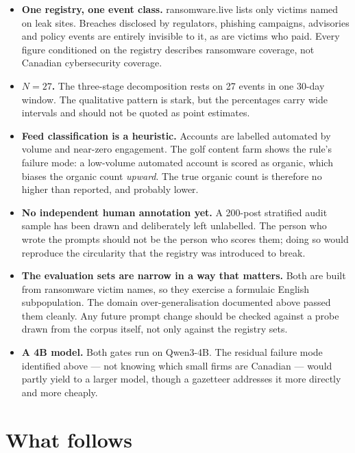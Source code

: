 \documentclass[11pt]{article}
\begin{document}
\begin{itemize}[leftmargin=1.4em,itemsep=3pt]
\item \textbf{One registry, one event class.} ransomware.live lists only
victims named on leak sites. Breaches disclosed by regulators, phishing
campaigns, advisories and policy events are entirely invisible to it, as are
victims who paid. Every figure conditioned on the registry describes ransomware
coverage, not Canadian cybersecurity coverage.
\item \textbf{$N = 27$.} The three-stage decomposition rests on 27 events in
one 30-day window. The qualitative pattern is stark, but the percentages carry
wide intervals and should not be quoted as point estimates.
\item \textbf{Feed classification is a heuristic.} Accounts are labelled
automated by volume and near-zero engagement. The golf content farm shows the
rule's failure mode: a low-volume automated account is scored as organic, which
biases the organic count \emph{upward}. The true organic count is therefore no
higher than reported, and probably lower.
\item \textbf{No independent human annotation yet.} A 200-post stratified
audit sample has been drawn and deliberately left unlabelled. The person who
wrote the prompts should not be the person who scores them; doing so would
reproduce the circularity that the registry was introduced to break.
\item \textbf{The evaluation sets are narrow in a way that matters.} Both
are built from ransomware victim names, so they exercise a formulaic English
subpopulation. The domain over-generalisation documented above passed them
cleanly. Any future prompt change should be checked against a probe drawn from
the corpus itself, not only against the registry sets.
\item \textbf{A 4B model.} Both gates run on Qwen3-4B. The residual failure
mode identified above --- not knowing which small firms are Canadian --- would
partly yield to a larger model, though a gazetteer addresses it more directly
and more cheaply.
\end{itemize}

\section{What follows}
\end{document}
